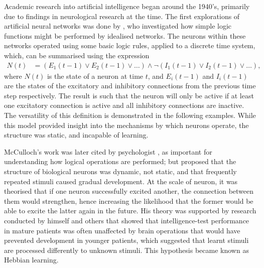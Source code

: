 Academic research into artificial intelligence began around the 1940's,
primarily due to findings in neurological research at the time.
The first explorations of artificial neural networks was done by
\cite{McCulloch:1943:Logical}, who investigated how simple logic functions
might be performed by idealised networks.
The neurons within these networks operated using some basic logic rules, applied
to a discrete time system, which, can be summarised using the expression
\begin{align*}
    N(t) &= (E_1(t-1) \vee E_2(t-1) \vee \dots)
        \wedge \neg(I_1(t-1) \vee I_2(t-1) \vee \dots),
\end{align*}
where $N(t)$ is the state of a neuron at time $t$, and $E_i(t-1)$ and $I_i(t-1)$
are the states of the excitatory and inhibitory connections from the previous
time step respectively.
The result is such that the neuron will only be active if at least one
excitatory connection is active and all inhibitory connections are inactive.
The versatility of this definition is demonstrated in the following examples.
While this model provided insight into the mechanisms by which neurons operate,
the structure was static, and incapable of learning.



McCulloch's work was later cited by psychologist \cite{Hebb:1949:Organization},
as important for understanding how logical operations are performed; but
proposed that the structure of biological neurons was dynamic, not static, and
that frequently repeated stimuli caused gradual development.
At the scale of neuron, it was theorised that if one neuron successfully
excited another, the connection between them would strengthen, hence
increasing the likelihood that the former would be able to excite the latter
again in the future.
His theory was supported by research conducted by himself and others that showed
that intelligence-test performance in mature patients was often unaffected by
brain operations that would have prevented development in younger patients,
which suggested that learnt stimuli are processed differently to unknown
stimuli.
This hypothesis became known as Hebbian learning.



